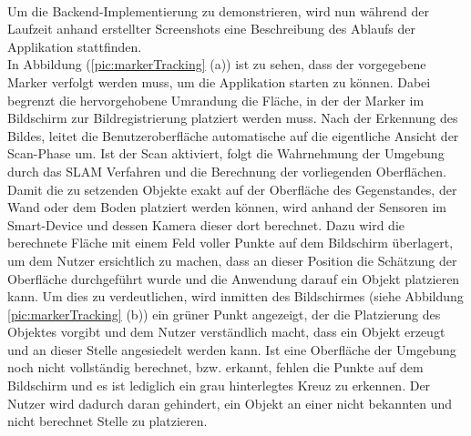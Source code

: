 \\ 
Um die Backend-Implementierung zu demonstrieren, wird nun während der Laufzeit anhand erstellter Screenshots eine Beschreibung des Ablaufs der Applikation stattfinden.
\\ 
In Abbildung (\ref{pic:markerTracking} (a)) ist zu sehen, dass der vorgegebene Marker verfolgt werden muss, um die Applikation starten zu können. Dabei begrenzt 
die hervorgehobene Umrandung die Fläche, in der der Marker im Bildschirm zur Bildregistrierung platziert werden muss. Nach der Erkennung des Bildes, 
leitet die Benutzeroberfläche automatische auf die eigentliche Ansicht der Scan-Phase um. Ist der Scan aktiviert, folgt die Wahrnehmung der Umgebung durch das 
\acs{SLAM} Verfahren und die Berechnung der vorliegenden Oberflächen. Damit die zu setzenden Objekte exakt auf der Oberfläche des Gegenstandes, der Wand oder dem 
Boden platziert werden können, wird anhand der Sensoren im Smart-Device und dessen Kamera dieser dort berechnet. Dazu wird die berechnete Fläche mit einem Feld voller 
Punkte auf dem Bildschirm überlagert, um dem Nutzer ersichtlich zu machen, 
dass an dieser Position die Schätzung der Oberfläche durchgeführt wurde und die Anwendung darauf ein Objekt platzieren kann. Um dies zu verdeutlichen, wird inmitten 
des Bildschirmes (siehe Abbildung \ref{pic:markerTracking} (b)) ein grüner Punkt angezeigt, der die Platzierung des Objektes vorgibt und dem Nutzer verständlich macht, 
dass ein Objekt erzeugt und an dieser Stelle angesiedelt werden kann. Ist eine Oberfläche der Umgebung noch nicht vollständig berechnet, bzw. erkannt, fehlen 
die Punkte auf dem Bildschirm und es ist lediglich ein grau hinterlegtes Kreuz zu erkennen. Der Nutzer wird dadurch daran gehindert, ein Objekt an einer nicht bekannten 
und nicht berechnet Stelle zu platzieren. 
